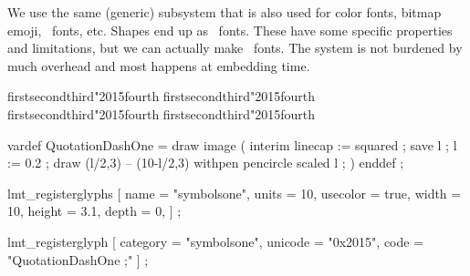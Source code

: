 \blank[2*line]

\startitem
    We use the same (generic) subsystem that is also used for color fonts, bitmap
    emoji, \SVG\ fonts, etc.
\stopitem
\startitem
    Shapes end up as \TYPETHREE\ fonts. These have some specific properties and
    limitations, but we can actually make \UNICODE\ fonts.
\stopitem
\startitem
    The system is not burdened by much overhead and most happens at embedding time.
\stopitem

\stopitemize

\page

\startbuffer[font]
\stopbuffer

\typebuffer[font] \getbuffer[font]

\startbuffer[demo]
\startlines
\DemoFontA first\endash second\emdash third\char"2015\relax fourth
\DemoFontB first\endash second\emdash third\char"2015\relax fourth
\DemoFontC first\endash second\emdash third\char"2015\relax fourth
\DemoFontD first\endash second\emdash third\char"2015\relax fourth
\stoplines
\stopbuffer

\typebuffer[demo] \getbuffer[demo]

\page

\startbuffer[mpone]

    vardef QuotationDashOne =
        draw image (
            interim linecap := squared ;
            save l ; l := 0.2 ;
            draw (l/2,3) -- (10-l/2,3) withpen pencircle scaled l ;
        )
    enddef ;

    lmt_registerglyphs [
        name     = "symbolsone",
        units    = 10,
        usecolor = true,
        width    = 10,
        height   = 3.1,
        depth    = 0,
    ] ;

    lmt_registerglyph [
        category = "symbolsone",
        unicode  = "0x2015",
        code     = "QuotationDashOne ;"
    ] ;

\stopMPcalculation
\stopbuffer

\getbuffer[mpone]

\startbuffer[font]

\stopbuffer

